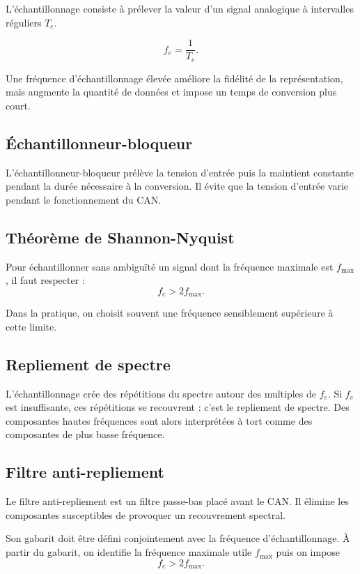 L'échantillonnage consiste à prélever la valeur d'un signal analogique à intervalles réguliers $T_e$.

\[
f_e=\frac{1}{T_e}.
\]

\TLEchantillonnageSignal

Une fréquence d'échantillonnage élevée améliore la fidélité de la représentation, mais augmente la quantité de données et impose un temps de conversion plus court.

\subsection{Échantillonneur-bloqueur}

L'échantillonneur-bloqueur prélève la tension d'entrée puis la maintient constante pendant la durée nécessaire à la conversion. Il évite que la tension d'entrée varie pendant le fonctionnement du CAN.

\subsection{Théorème de Shannon-Nyquist}

Pour échantillonner sans ambiguïté un signal dont la fréquence maximale est $f_{\max}$, il faut respecter :
\[
\boxed{f_e>2f_{\max}}.
\]

Dans la pratique, on choisit souvent une fréquence sensiblement supérieure à cette limite.

\subsection{Repliement de spectre}

L'échantillonnage crée des répétitions du spectre autour des multiples de $f_e$. Si $f_e$ est insuffisante, ces répétitions se recouvrent : c'est le repliement de spectre. Des composantes hautes fréquences sont alors interprétées à tort comme des composantes de plus basse fréquence.

\subsection{Filtre anti-repliement}

Le filtre anti-repliement est un filtre passe-bas placé avant le CAN. Il élimine les composantes susceptibles de provoquer un recouvrement spectral.

Son gabarit doit être défini conjointement avec la fréquence d'échantillonnage. À partir du gabarit, on identifie la fréquence maximale utile $f_{\max}$ puis on impose
\[
f_e>2f_{\max}.
\]

